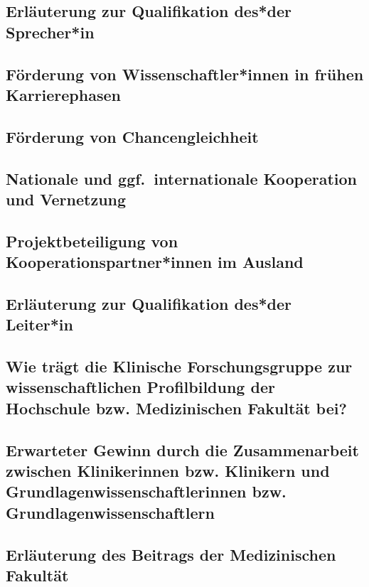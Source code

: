 \documentclass[german, 53.02]{proposal}
\begin{document}
\subsection{Erläuterung zur Qualifikation des*der Sprecher*in}

\subsection{Förderung von Wissenschaftler*innen in frühen Karrierephasen}

\subsection{Förderung von Chancengleichheit}

\subsection{Nationale und ggf.\ internationale Kooperation und Vernetzung}

\subsection{Projektbeteiligung von Kooperationspartner*innen im Ausland}

\subsection{Erläuterung zur Qualifikation des*der Leiter*in}

\subsection{Wie trägt die Klinische Forschungsgruppe zur wissenschaftlichen Profilbildung der Hochschule bzw. Medizinischen Fakultät bei?}

\subsection{Erwarteter Gewinn durch die Zusammenarbeit zwischen Klinikerinnen bzw. Klinikern und Grundlagenwissenschaftlerinnen bzw. Grundlagenwissenschaftlern}

\subsection{Erläuterung des Beitrags der Medizinischen Fakultät}
\end{document}
